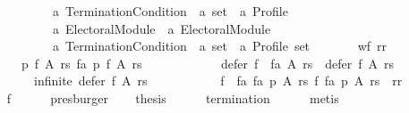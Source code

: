\begin{isabellebody}
\ \ \ \ \ \ \ \ \ \ \ \ \ {\isacharparenleft}{\kern0pt}{\isacharprime}{\kern0pt}a\ Termination{\isacharunderscore}{\kern0pt}Condition{\isacharparenright}{\kern0pt}\ {\isasymtimes}\ {\isacharprime}{\kern0pt}a\ set\ {\isasymtimes}\ {\isacharprime}{\kern0pt}a\ Profile{\isacharparenright}{\kern0pt}\ {\isasymtimes}\isanewline
\ \ \ \ \ \ \ \ \ \ \ \ \ {\isacharparenleft}{\kern0pt}{\isacharprime}{\kern0pt}a\ Electoral{\isacharunderscore}{\kern0pt}Module{\isacharparenright}{\kern0pt}\ {\isasymtimes}\ {\isacharparenleft}{\kern0pt}{\isacharprime}{\kern0pt}a\ Electoral{\isacharunderscore}{\kern0pt}Module{\isacharparenright}{\kern0pt}\ {\isasymtimes}\isanewline
\ \ \ \ \ \ \ \ \ \ \ \ \ {\isacharparenleft}{\kern0pt}{\isacharprime}{\kern0pt}a\ Termination{\isacharunderscore}{\kern0pt}Condition{\isacharparenright}{\kern0pt}\ {\isasymtimes}\ {\isacharprime}{\kern0pt}a\ set\ {\isasymtimes}\ {\isacharprime}{\kern0pt}a\ Profile{\isacharparenright}{\kern0pt}\ set{\isachardoublequoteclose}\ \isanewline
\ \ \ \ \ \ {\isachardoublequoteopen}wf\ rr\ {\isasymand}\isanewline
\ \ \ \ \ \ \ \ {\isacharparenleft}{\kern0pt}{\isasymforall}p\ f\ A\ rs\ fa{\isachardot}{\kern0pt}\ p\ {\isacharparenleft}{\kern0pt}f\ A\ rs{\isacharparenright}{\kern0pt}\ {\isasymor}\isanewline
\ \ \ \ \ \ \ \ \ \ {\isasymnot}\ defer\ {\isacharparenleft}{\kern0pt}f\ {\isasymtriangleright}\ fa{\isacharparenright}{\kern0pt}\ A\ rs\ {\isasymsubset}\ defer\ f\ A\ rs\ {\isasymor}\isanewline
\ \ \ \ \ \ \ \ \ \ infinite\ {\isacharparenleft}{\kern0pt}defer\ f\ A\ rs{\isacharparenright}{\kern0pt}\ {\isasymor}\isanewline
\ \ \ \ \ \ \ \ \ \ {\isacharparenleft}{\kern0pt}{\isacharparenleft}{\kern0pt}f\ {\isasymtriangleright}\ fa{\isacharcomma}{\kern0pt}\ fa{\isacharcomma}{\kern0pt}\ p{\isacharcomma}{\kern0pt}\ A{\isacharcomma}{\kern0pt}\ rs{\isacharparenright}{\kern0pt}{\isacharcomma}{\kern0pt}\ f{\isacharcomma}{\kern0pt}\ fa{\isacharcomma}{\kern0pt}\ p{\isacharcomma}{\kern0pt}\ A{\isacharcomma}{\kern0pt}\ rs{\isacharparenright}{\kern0pt}\ {\isasymin}\ rr{\isacharparenright}{\kern0pt}{\isachardoublequoteclose}\isanewline
\ \ \ \ \isamarkupfalse%
\ f{}\isanewline
\ \ \ \ \isamarkupfalse%
\ presburger\isanewline
\ \ \isamarkupfalse%
\ {\isacharquery}{\kern0pt}thesis\isanewline
\ \ \ \ \isamarkupfalse%
\ {\isachardoublequoteopen}termination{\isachardoublequoteclose}\isanewline
\ \ \ \ \isamarkupfalse%
\ metis\isanewline
{}\isamarkupfalse%
%
\endisatagproof
{\isafoldproof}%
%
\isadelimproof
\isanewline

\end{isabellebody}

